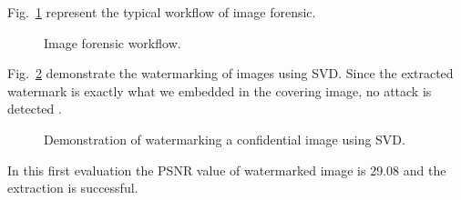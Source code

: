 \documentclass[
  journal,
]{IEEEtran}%
\begin{document}
Fig.~\ref{fig-inageforensic} represent the typical workflow of image
forensic.

\begin{figure}


\caption{\label{fig-inageforensic}Image forensic workflow.}

\end{figure}%

Fig.~\ref{fig-image-forensicSVD} demonstrate the watermarking of images
using SVD. Since the extracted watermark is exactly what we embedded in
the covering image, no attack is detected
.

\begin{figure}


\caption{\label{fig-image-forensicSVD}Demonstration of watermarking a
confidential image using SVD.}

\end{figure}%

In this first evaluation the PSNR value of watermarked image is 29.08
and the extraction is successful.
\end{document}
